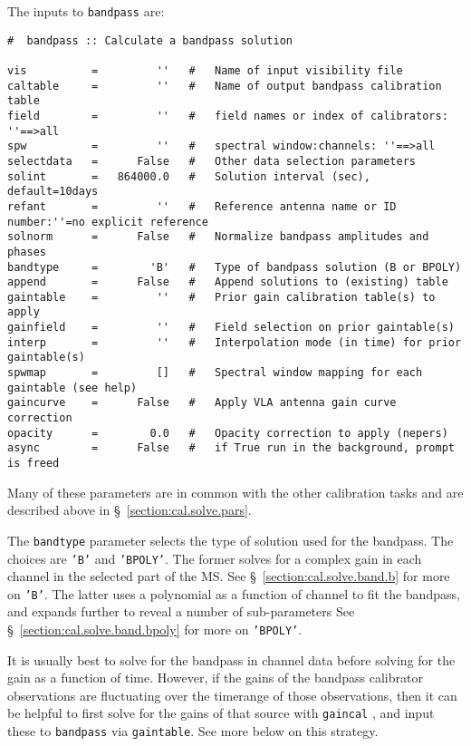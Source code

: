 The inputs to {\tt bandpass} are:
\small
\begin{verbatim}
#  bandpass :: Calculate a bandpass solution

vis          =         ''   #   Name of input visibility file
caltable     =         ''   #   Name of output bandpass calibration table
field        =         ''   #   field names or index of calibrators: ''==>all
spw          =         ''   #   spectral window:channels: ''==>all 
selectdata   =      False   #   Other data selection parameters
solint       =   864000.0   #   Solution interval (sec), default=10days
refant       =         ''   #   Reference antenna name or ID number:''=no explicit reference
solnorm      =      False   #   Normalize bandpass amplitudes and phases
bandtype     =        'B'   #   Type of bandpass solution (B or BPOLY)
append       =      False   #   Append solutions to (existing) table
gaintable    =         ''   #   Prior gain calibration table(s) to apply
gainfield    =         ''   #   Field selection on prior gaintable(s)
interp       =         ''   #   Interpolation mode (in time) for prior gaintable(s)
spwmap       =         []   #   Spectral window mapping for each gaintable (see help)
gaincurve    =      False   #   Apply VLA antenna gain curve correction
opacity      =        0.0   #   Opacity correction to apply (nepers)
async        =      False   #   if True run in the background, prompt is freed
\end{verbatim}
\normalsize
Many of these parameters are in common with the other calibration
tasks and are described above in \S~\ref{section:cal.solve.pars}.

The {\tt bandtype} parameter selects the type of solution used for the
bandpass.  The choices are {\tt 'B'} and {\tt 'BPOLY'}.  The former 
solves for a complex gain in each channel in the selected part of the
MS. See \S~\ref{section:cal.solve.band.b} for more on {\tt 'B'}.
The latter uses a polynomial as a function of channel to fit the
bandpass, and expands further to reveal a number of sub-parameters
See \S~\ref{section:cal.solve.band.bpoly} for more on {\tt 'BPOLY'}.

It is usually best to solve for the bandpass in channel data before
solving for the gain as a function of time.  However, if the gains of
the bandpass calibrator observations are fluctuating over the
timerange of those observations, then it can be helpful to first solve
for the gains of that source with {\tt gaincal} , and input these to
{\tt bandpass} via {\tt gaintable}.  See more below on this strategy.

